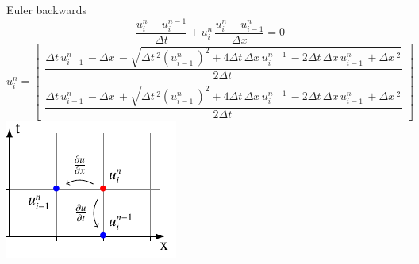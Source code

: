 %
%
%

\begin{frame}
  \begin{columns}
      Euler backwards
  $$\frac{u_{i}^{n}-u_{i}^{n-1}}{\Delta t}+ u_{i}^{n}\, \frac{u_{i}^{n}-u_{i-1}^{n}}{\Delta x}=0$$
  \tiny{
  $$ u_{i}^{n} = \begin{bmatrix}
     \dfrac{\Delta{t}\, u^{n}_{i-1}\, - \Delta{x}\, - \sqrt{\Delta{t}\,^{2} \left(u^{n}_{i-1}\,\right)^{2} + 4 \Delta{t}\, \Delta{x}\, u^{n-1}_{i}\, - 2 \Delta{t}\, \Delta{x}\, u^{n}_{i-1}\, + \Delta{x}\,^{2}}}{2 \Delta{t}\,} \\[15pt]
     \dfrac{\Delta{t}\, u^{n}_{i-1}\, - \Delta{x}\, + \sqrt{\Delta{t}\,^{2} \left(u^{n}_{i-1}\,\right)^{2} + 4 \Delta{t}\, \Delta{x}\, u^{n-1}_{i}\, - 2 \Delta{t}\, \Delta{x}\, u^{n}_{i-1}\, + \Delta{x}\,^{2}}}{2 \Delta{t}\,}
  \end{bmatrix}$$}
    \includegraphics[width=\linewidth]{../BurgersEquation/tikz/quadratic/quadratic.pdf}\\
  \end{columns}
\end{frame}

